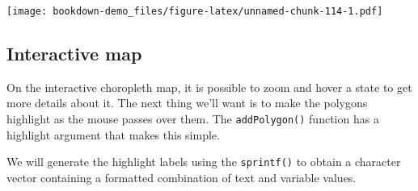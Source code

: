\documentclass[]{book}
\newenvironment{Shaded}{\begin{snugshade}}{\end{snugshade}}
\newcommand{\KeywordTok}[1]{\textcolor[rgb]{0.13,0.29,0.53}{\textbf{#1}}}
\newcommand{\DataTypeTok}[1]{\textcolor[rgb]{0.13,0.29,0.53}{#1}}
\newcommand{\DecValTok}[1]{\textcolor[rgb]{0.00,0.00,0.81}{#1}}
\newcommand{\FloatTok}[1]{\textcolor[rgb]{0.00,0.00,0.81}{#1}}
\newcommand{\StringTok}[1]{\textcolor[rgb]{0.31,0.60,0.02}{#1}}
\newcommand{\OperatorTok}[1]{\textcolor[rgb]{0.81,0.36,0.00}{\textbf{#1}}}
\newcommand{\NormalTok}[1]{#1}
\begin{document}
\begin{Shaded}
\end{Shaded}

\texttt{[image: bookdown-demo\_files/figure-latex/unnamed-chunk-114-1.pdf]}

\subsection{Interactive map}\label{interactive-map}

On the interactive choropleth map, it is possible to zoom and hover a
state to get more details about it. The next thing we'll want is to make
the polygons highlight as the mouse passes over them. The
\texttt{addPolygon()} function has a highlight argument that makes this
simple.

We will generate the highlight labels using the \texttt{sprintf()} to
obtain a character vector containing a formatted combination of text and
variable values.

\begin{Shaded}
\end{Shaded}
\end{document}
